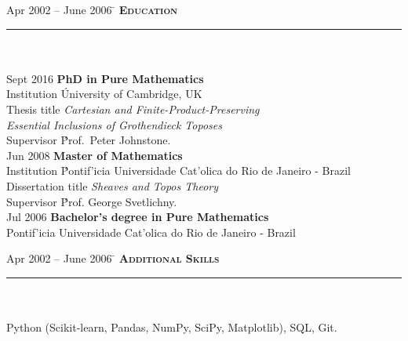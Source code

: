 \documentclass[11pt,a4paper]{article}
\begin{document}
\begin{tabbing} 
Apr 2002 -- June 2006 \=\kill
\> \textbf{\Large{\textsc{Education}}} \\
\> \noindent\rule{11cm}{1pt}\\
\> \\
\> Sept 2016 \' \textbf{PhD in Pure Mathematics}\\
\> Institution \' University of Cambridge, UK\\ 
\> Thesis title \' \textit{Cartesian and Finite-Product-Preserving} \\ \> \textit{Essential Inclusions of Grothendieck Toposes} \\
\>Supervisor \' Prof.\ Peter Johnstone.\\ [.5\baselineskip]

 \> Jun 2008 \' \textbf{Master of Mathematics}\\
\> Institution \' Pontif\a'icia Universidade Cat\a'olica do Rio de Janeiro - Brazil\\
\>Dissertation title  \' \textit{Sheaves and Topos Theory}\\
\>Supervisor \' Prof. George Svetlichny.\\ [.5\baselineskip]

\> Jul 2006 \' \textbf{Bachelor's degree in Pure Mathematics}\\
\>Pontif\a'icia Universidade Cat\a'olica do Rio de Janeiro - Brazil\\
\end{tabbing}
\begin{tabbing} 
Apr 2002 -- June 2006 \=\kill
\> \textbf{\Large{\textsc{Additional Skills}}}\\
\> \noindent\rule{11cm}{1pt}\\
\\
\>  Python (Scikit-learn, Pandas, NumPy, SciPy, Matplotlib), SQL, Git. \\
\end{tabbing}
\end{document}
